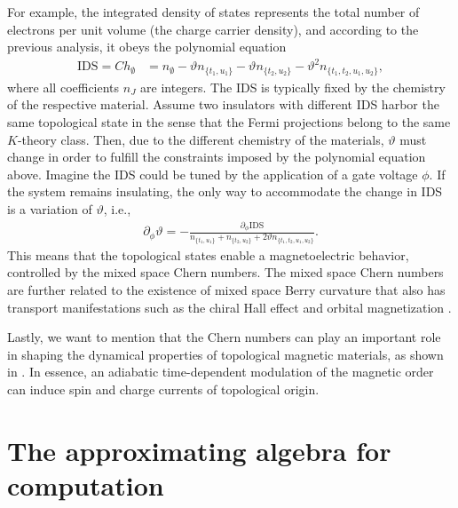 \documentclass[submission, Phys]{SciPost}
\begin{document}
For example, the integrated density of states represents the total number of electrons per unit volume (the charge carrier density), and according to the previous analysis, it obeys the polynomial equation
\begin{align}
     \mathrm{IDS} = Ch_{\emptyset} &= n_{\emptyset} - \vartheta n_{\lbrace t_1, u_1\rbrace} - \vartheta n_{\lbrace t_2, u_2 \rbrace} - \vartheta^2 n_{\lbrace t_1, t_2, u_1, u_2 \rbrace},
     \label{eq:ids_constraint}
\end{align}
where all coefficients $n_J$ are integers.
The IDS is typically fixed by the chemistry of the respective material.
Assume two insulators with different IDS harbor the same topological state in the sense that the Fermi projections belong to the same $K$-theory class.
Then, due to the different chemistry of the materials, $\vartheta$ must change in order to fulfill the constraints imposed by the polynomial equation above.
Imagine the IDS could be tuned by the application of a gate voltage $\phi$. 
If the system remains insulating, the only way to accommodate the change in IDS is a variation of $\vartheta$, i.e.,
\begin{align}
   \partial_\phi \vartheta     = -  
   \frac{\partial_\phi\mathrm{IDS}}{n_{\lbrace t_1, u_1\rbrace} +  n_{\lbrace t_2, u_2 \rbrace} + 2 \vartheta n_{\lbrace t_1, t_2, u_1, u_2 \rbrace}}.
\end{align}
This means that the topological states enable a magnetoelectric behavior, controlled by the mixed space Chern numbers.
The mixed space Chern numbers are further related to the existence of mixed space Berry curvature that also has transport manifestations such as the chiral Hall effect \cite{Lux2020,Kipp2021} and orbital magnetization \cite{Lux2018}.

Lastly, we want to mention that the Chern numbers can play an important role in shaping the dynamical properties of topological magnetic materials, as shown in \cite{Yang2011}.
In essence, an adiabatic time-dependent modulation of the magnetic order can induce spin and charge currents of topological origin.

\section{The approximating algebra for computation}
\label{sec:computation}
\end{document}
